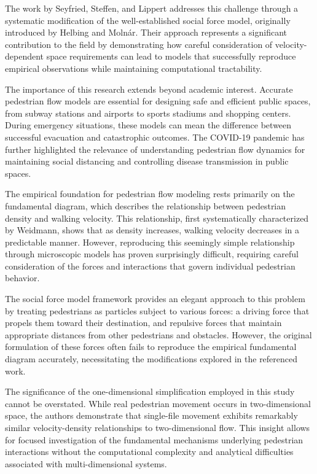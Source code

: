 \documentclass[12pt,a4paper]{article}
\begin{document}
The work by Seyfried, Steffen, and Lippert addresses this challenge through a systematic modification of the well-established social force model, originally introduced by Helbing and Molnár. Their approach represents a significant contribution to the field by demonstrating how careful consideration of velocity-dependent space requirements can lead to models that successfully reproduce empirical observations while maintaining computational tractability.

The importance of this research extends beyond academic interest. Accurate pedestrian flow models are essential for designing safe and efficient public spaces, from subway stations and airports to sports stadiums and shopping centers. During emergency situations, these models can mean the difference between successful evacuation and catastrophic outcomes. The COVID-19 pandemic has further highlighted the relevance of understanding pedestrian flow dynamics for maintaining social distancing and controlling disease transmission in public spaces.

The empirical foundation for pedestrian flow modeling rests primarily on the fundamental diagram, which describes the relationship between pedestrian density and walking velocity. This relationship, first systematically characterized by Weidmann, shows that as density increases, walking velocity decreases in a predictable manner. However, reproducing this seemingly simple relationship through microscopic models has proven surprisingly difficult, requiring careful consideration of the forces and interactions that govern individual pedestrian behavior.

The social force model framework provides an elegant approach to this problem by treating pedestrians as particles subject to various forces: a driving force that propels them toward their destination, and repulsive forces that maintain appropriate distances from other pedestrians and obstacles. However, the original formulation of these forces often fails to reproduce the empirical fundamental diagram accurately, necessitating the modifications explored in the referenced work.

The significance of the one-dimensional simplification employed in this study cannot be overstated. While real pedestrian movement occurs in two-dimensional space, the authors demonstrate that single-file movement exhibits remarkably similar velocity-density relationships to two-dimensional flow. This insight allows for focused investigation of the fundamental mechanisms underlying pedestrian interactions without the computational complexity and analytical difficulties associated with multi-dimensional systems.
\end{document}
